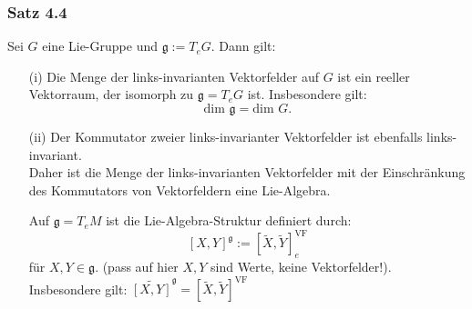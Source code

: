\documentclass[fleqn, 12pt, letterpaper]{article}
\newcommand{\txt}[1]{\text{#1}}
\begin{document}
\subsubsection*{Satz 4.4}
Sei \( G \) eine Lie-Gruppe und \( \mathfrak{g} := T_e G \). Dann gilt:
\begin{itemize}
    \item[(i)] Die Menge der links-invarianten Vektorfelder auf \( G \) ist ein reeller Vektorraum, der isomorph zu $\mathfrak{g}=T_eG$ ist. Insbesondere gilt:
    \[
    \txt{dim } \mathfrak{g} =\txt{dim }G.
    \]

    \item[(ii)] Der Kommutator zweier links-invarianter Vektorfelder ist ebenfalls links-invariant. \\
    Daher ist die Menge der links-invarianten Vektorfelder mit der Einschränkung des Kommutators von Vektorfeldern eine Lie-Algebra.

    Auf \( \mathfrak{g} = T_e M \) ist die Lie-Algebra-Struktur definiert durch:
    \[
    [X, Y]^{\mathfrak{g}} := [\tilde{X}, \tilde{Y}]_e^{\txt{VF}}
    \]
    für \( X, Y \in \mathfrak{g} \). (pass auf hier $X, Y$ sind Werte, keine Vektorfelder!). \\
    Insbesondere gilt:
    \(
    \widetilde{[X, Y]}^{\mathfrak{g}} = [\tilde{X}, \tilde{Y}]^{\txt{VF}}
    \)
\end{itemize}
\end{document}
